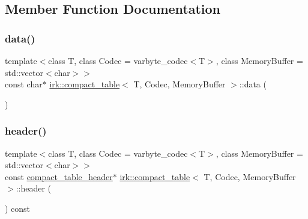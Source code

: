 \subsection{Member Function Documentation}
\mbox{\label{classirk_1_1compact__table_a6e52197052d12372b72d568ce9df384f}} 
\subsubsection{\texorpdfstring{data()}{data()}}
{\footnotesize\ttfamily template$<$class T, class Codec = varbyte\+\_\+codec$<$\+T$>$, class Memory\+Buffer = std\+::vector$<$char$>$$>$ \\
const char$\ast$ \mbox{\hyperlink{classirk_1_1compact__table}{irk\+::compact\+\_\+table}}$<$ T, Codec, Memory\+Buffer $>$\+::data (\begin{DoxyParamCaption}{ }\end{DoxyParamCaption})\hspace{0.3cm}{\ttfamily [inline]}}

\mbox{\label{classirk_1_1compact__table_a71a7a452bf75a037e9bf22e231124a5e}} 
\subsubsection{\texorpdfstring{header()}{header()}}
{\footnotesize\ttfamily template$<$class T, class Codec = varbyte\+\_\+codec$<$\+T$>$, class Memory\+Buffer = std\+::vector$<$char$>$$>$ \\
const \mbox{\hyperlink{structirk_1_1compact__table__header}{compact\+\_\+table\+\_\+header}}$\ast$ \mbox{\hyperlink{classirk_1_1compact__table}{irk\+::compact\+\_\+table}}$<$ T, Codec, Memory\+Buffer $>$\+::header (\begin{DoxyParamCaption}{ }\end{DoxyParamCaption}) const\hspace{0.3cm}{\ttfamily [inline]}}

\mbox{\label{classirk_1_1compact__table_a8a83916106db809f8b93acb1e90104a2}} 
